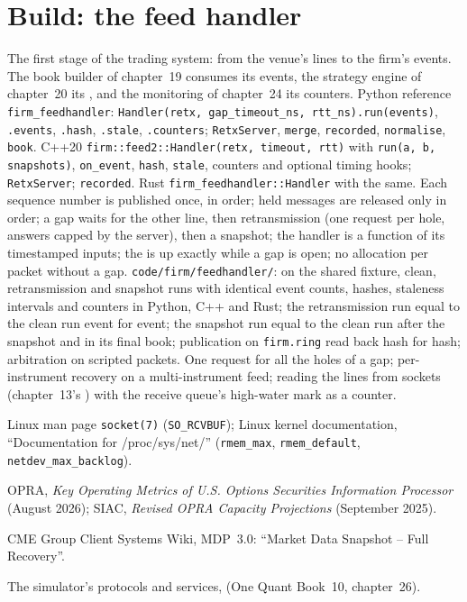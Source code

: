 \section{Build: the feed handler}\label{bld:ll:the-feed-handler:feedhandler}

\begin{build}
 The first stage of the trading system: from the venue's lines to the firm's events. The book builder of
chapter~19 consumes its events, the strategy engine of chapter~20 its , and the monitoring of chapter~24 its
counters.
 Python reference \texttt{firm\_feedhandler}: \texttt{Handler(retx, gap\_timeout\_ns, rtt\_ns).run(events)},
\texttt{.events}, \texttt{.hash}, \texttt{.stale}, \texttt{.counters}; \texttt{RetxServer}, \texttt{merge}, \texttt{recorded},
\texttt{normalise}, \texttt{book}. C++20 \texttt{firm::feed2::Handler(retx, timeout, rtt)} with \texttt{run(a, b, snapshots)},
\texttt{on\_event}, \texttt{hash}, \texttt{stale}, counters and optional timing hooks; \texttt{RetxServer}; \texttt{recorded}.
Rust \texttt{firm\_feedhandler::Handler} with the same.
 Each sequence number is published once, in order; held messages are released only in order; a gap waits for the
other line, then retransmission (one request per hole, answers capped by the server), then a snapshot; the handler is a
function of its timestamped inputs; the  is up exactly while a gap is open; no allocation per packet without a
gap.
 \texttt{code/firm/feedhandler/}: on the shared fixture, clean, retransmission and snapshot runs with
identical event counts, hashes, staleness intervals and counters in Python, C++ and Rust; the retransmission run equal to the
clean run event for event; the snapshot run equal to the clean run after the snapshot and in its final book; publication on
\texttt{firm.ring} read back hash for hash; arbitration on scripted packets.
 One request for all the holes of a gap; per-instrument recovery on a multi-instrument feed; reading the lines
from sockets (chapter~13's ) with the receive queue's high-water mark as a counter.
\end{build}

\begin{omsources}
\item Linux man page \texttt{socket(7)} (\texttt{SO\_RCVBUF}); Linux kernel documentation, ``Documentation for
/proc/sys/net/'' (\texttt{rmem\_max}, \texttt{rmem\_default}, \texttt{netdev\_max\_backlog}).
\item OPRA, \emph{Key Operating Metrics of U.S. Options Securities Information Processor} (August 2026); SIAC, \emph{Revised
OPRA Capacity Projections} (September 2025).
\item CME Group Client Systems Wiki, MDP~3.0: ``Market Data Snapshot -- Full Recovery''.
\item The simulator's protocols and services,  (One Quant Book~10, chapter~26).
\end{omsources}

